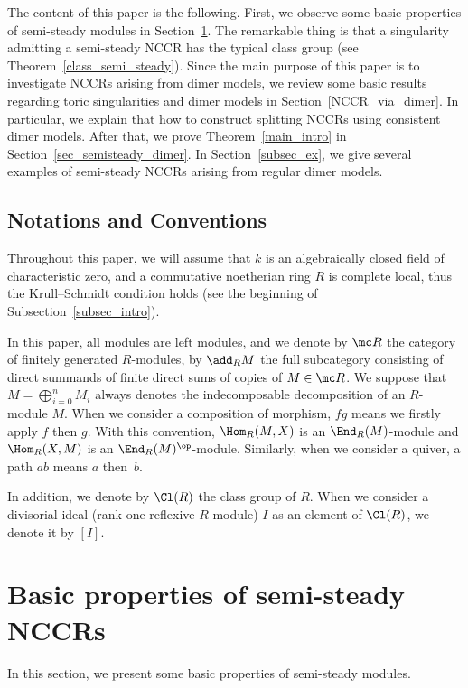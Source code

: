 The content of this paper is the following. First, we observe some basic properties of semi-steady modules in Section~\ref{sec_semisteady}. The remarkable thing is that a singularity admitting a semi-steady NCCR has the typical class group (see Theorem~\ref{class_semi_steady}). Since the main purpose of this paper is to investigate NCCRs arising from dimer models, we review some basic results regarding toric singularities and dimer models in Section~\ref{NCCR_via_dimer}. In particular, we explain that how to construct splitting NCCRs using consistent dimer models. After that, we prove Theorem~\ref{main_intro} in Section~\ref{sec_semisteady_dimer}. In Section~\ref{subsec_ex}, we give several examples of semi-steady NCCRs arising from regular dimer models.

\subsection*{Notations and Conventions}

Throughout this paper, we will assume that $k$ is an algebraically closed field of characteristic zero, and a commutative noetherian ring $R$ is complete local, thus the Krull--Schmidt condition holds (see the beginning of Subsection~\ref{subsec_intro}).

In this paper, all modules are left modules, and we denote by $\mc R$ the category of finitely generated $R$-modules, by $\add_RM$ the full subcategory consisting of direct summands of finite direct sums of copies of $M\in \mc R$. We suppose that $M=\bigoplus^n_{i=0}M_i$ always denotes the indecomposable decomposition of an $R$-module $M$. When we consider a composition of morphism, $fg$ means we firstly apply $f$ then $g$. With this convention, $\Hom_R(M, X)$ is an $\End_R(M)$-module and $\Hom_R(X, M)$ is an $\End_R(M)^{\op}$-module. Similarly, when we consider a quiver, a path $ab$ means $a$ then~$b$.

In addition, we denote by $\Cl(R)$ the class group of $R$. When we consider a divisorial ideal (rank one reflexive $R$-module) $I$ as an element of $\Cl(R)$, we denote it by $[I]$.


\section{Basic properties of semi-steady NCCRs}\label{sec_semisteady}

In this section, we present some basic properties of semi-steady modules.

